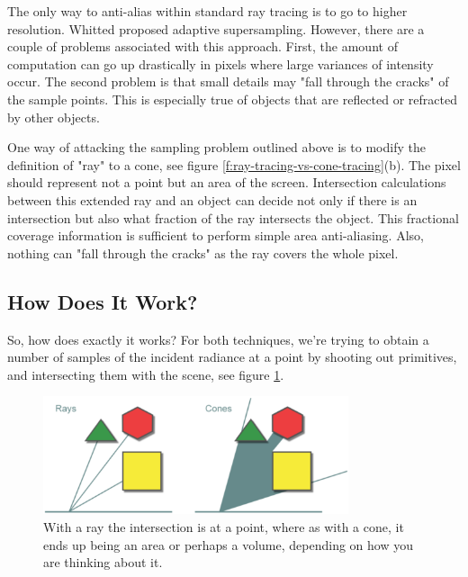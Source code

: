 The only way to anti-alias within standard ray tracing is to go to higher resolution. Whitted proposed adaptive supersampling\cite[-4mm]{a:ray-tracing}. However, there are a couple of problems associated with this approach. First, the amount of computation can go up drastically in pixels where large variances of intensity occur. The second problem is that small details may "fall through the cracks" of the sample points. This is especially true of objects that are reflected or refracted by other objects.

One way of attacking the sampling problem outlined above is to modify the definition of "ray" to a cone, see figure \ref{f:ray-tracing-vs-cone-tracing}(b). The pixel should represent not a point but an area of the screen. Intersection calculations between this extended ray and an object can decide not only if there is an intersection but also what fraction of the ray intersects the object. This fractional coverage information is sufficient to perform simple area anti-aliasing. Also, nothing can "fall through the cracks" as the ray covers the whole pixel.  



\subsection{How Does It Work?}
So, how does exactly it works? For both techniques, we're trying to obtain a number of samples of the incident radiance at a point by shooting out primitives, and intersecting them with the scene, see figure \ref{f:rays-and-cones}.

\begin{figure}\label{f:rays-and-cones}
	\begin{center}
		\includegraphics[width=0.8\textwidth]{graphics/vct/vct-2-1}
	\end{center}
	\caption{With a ray the intersection is at a point, where as with a cone, it ends up being an area or perhaps a volume, depending on how you are thinking about it.}
\end{figure}

